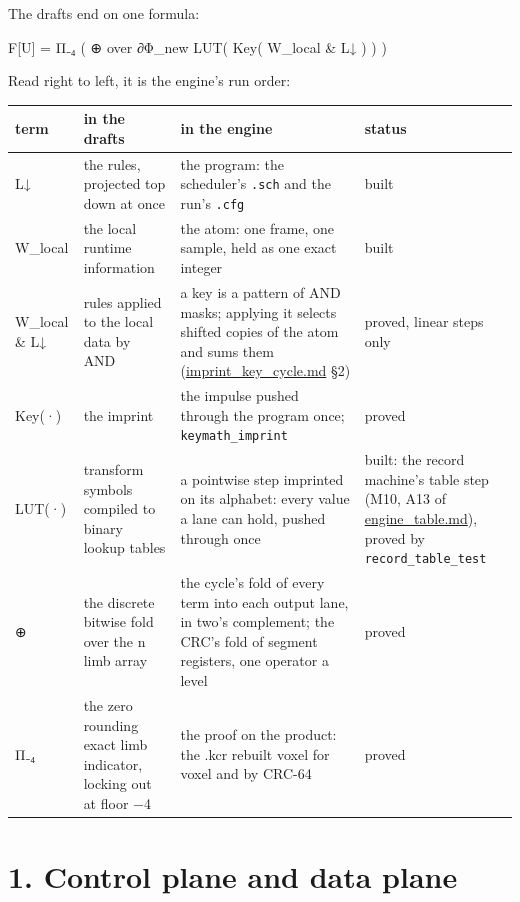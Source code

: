 The drafts end on one formula:

F[U] = Π₋₄ ( ⊕ over ∂Φ\_\allowbreak{}new  LUT( Key( W\_\allowbreak{}local \& L↓ ) ) )

Read right to left, it is the engine's run order:

{\footnotesize
\setlength{\tabcolsep}{6pt}
\begin{longtable}{>{\RaggedRight\arraybackslash}p{}>{\RaggedRight\arraybackslash}p{}>{\RaggedRight\arraybackslash}p{}>{\RaggedRight\arraybackslash}p{}}
\toprule
term & in the drafts & in the engine & status \\
\midrule
\endhead
L↓ & the rules, projected top down at once & the program: the scheduler's \texttt{.\allowbreak{}sch} and the run's \texttt{.\allowbreak{}cfg} & built \\
W\_\allowbreak{}local & the local runtime information & the atom: one frame, one sample, held as one exact integer & built \\
W\_\allowbreak{}local \& L↓ & rules applied to the local data by AND & a key is a pattern of AND masks; applying it selects shifted copies of the atom and sums them (\hyperref[chap:imprint-key-cycle]{imprint\_\allowbreak{}key\_\allowbreak{}cycle.md} §2) & proved, linear steps only \\
Key(·) & the imprint & the impulse pushed through the program once; \texttt{keymath\_\allowbreak{}imprint} & proved \\
LUT(·) & transform symbols compiled to binary lookup tables & a pointwise step imprinted on its alphabet: every value a lane can hold, pushed through once & built: the record machine's table step (M10, A13 of \hyperref[chap:engine-table]{engine\_\allowbreak{}table.md}), proved by \texttt{record\_\allowbreak{}table\_\allowbreak{}test} \\
⊕ & the discrete bitwise fold over the n limb array & the cycle's fold of every term into each output lane, in two's complement; the CRC's fold of segment registers, one operator a level & proved \\
Π₋₄ & the zero rounding exact limb indicator, locking out at floor −4 & the proof on the product: the .kcr rebuilt voxel for voxel and by CRC-64 & proved \\
\bottomrule
\end{longtable}
}

\section{\texorpdfstring{1. Control plane and data plane}{1. Control plane and data plane}}

